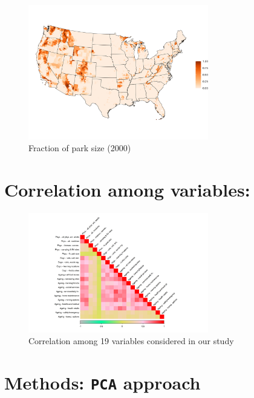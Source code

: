 \documentclass[
  letterpaper,
  DIV=11,
  numbers=noendperiod]{scrartcl}
\begin{document}
\begin{figure}

{\centering \includegraphics[width=0.7\textwidth,height=\textheight]{imgs/park_2000.png}

}

\caption{Fraction of park size (2000)}

\end{figure}

\hypertarget{correlation-among-variables}{%
\section{Correlation among
variables:}\label{correlation-among-variables}}

\begin{figure}

{\centering \includegraphics[width=0.7\textwidth,height=\textheight]{imgs/correlationPlot1.png}

}

\caption{Correlation among 19 variables considered in our study}

\end{figure}

\hypertarget{methods-pca-approach}{%
\section{\texorpdfstring{Methods: \texttt{PCA}
approach}{Methods: PCA approach}}\label{methods-pca-approach}}
\end{document}
